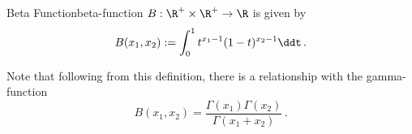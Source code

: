 \begin{definition}{Beta Function}{beta-function}
  $B: \R^+\times\R^+ \to \R$ is given by
  $$B(x_1, x_2) := \int_0^1 t^{x_1-1}(1-t)^{x_2-1} \ddt\,.$$
\end{definition}

Note that following from this definition, there is a relationship with the gamma-function
\begin{equation}
  B(x_1, x_2) = \frac{\Gamma(x_1) \Gamma(x_2)}{\Gamma(x_1 + x_2)}\,.
  \label{eq:beta-gamma}
\end{equation}
